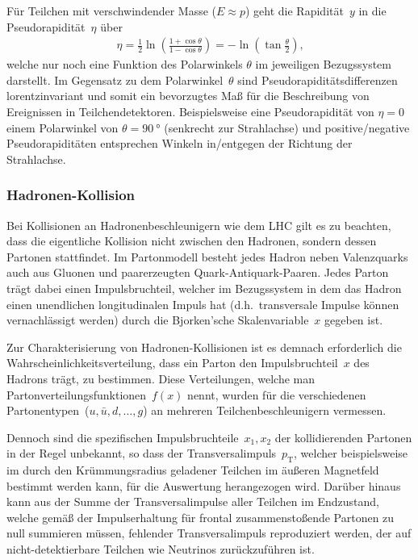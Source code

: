 \documentclass[11pt, a4paper]{article}
\numberwithin{equation}{section}
\begin{document}
Für Teilchen mit verschwindender Masse ($E \approx p$) geht die Rapidität~$y$ in die Pseudorapidität~$\eta$ über
\begin{align}
	\eta = \frac{1}{2} \ln\left( \frac{1 + \cos\theta}{1 - \cos\theta} \right) = - \ln\left( \tan\frac{\theta}{2} \right)\text{,}
	\label{eq:pseudorapidity}
\end{align}
welche nur noch eine Funktion des Polarwinkels $\theta$ im jeweiligen Bezugssystem darstellt.
Im Gegensatz zu dem Polarwinkel~$\theta$ sind Pseudorapiditätsdifferenzen lorentzinvariant und somit ein bevorzugtes Maß für die Beschreibung von Ereignissen in Teilchendetektoren.
Beispielsweise eine Pseudorapidität von $\eta = \num{0}$ einem Polarwinkel von $\theta = \SI{90}{\degree}$ (senkrecht zur Strahlachse) und positive/negative Pseudorapiditäten entsprechen Winkeln in/entgegen der Richtung der Strahlachse.

\subsubsection{Hadronen-Kollision}
\label{sssec:hadronen_kollision}
Bei Kollisionen an Hadronenbeschleunigern wie dem LHC gilt es zu beachten, dass die eigentliche Kollision nicht zwischen den Hadronen, sondern dessen Partonen stattfindet.
Im Partonmodell besteht jedes Hadron neben Valenzquarks auch aus Gluonen und paarerzeugten Quark-Antiquark-Paaren.
Jedes Parton trägt dabei einen Impulsbruchteil, welcher im Bezugssystem in dem das Hadron einen unendlichen longitudinalen Impuls hat (d.h.\ transversale Impulse können vernachlässigt werden) durch die Bjorken'sche Skalenvariable~$x$ gegeben ist.

Zur Charakterisierung von Hadronen-Kollisionen ist es demnach erforderlich die Wahrscheinlichkeitsverteilung, dass ein Parton den Impulsbruchteil~$x$ des Hadrons trägt, zu bestimmen.
Diese Verteilungen, welche man Partonverteilungsfunktionen~$f(x)$ nennt, wurden für die verschiedenen Partonentypen~($u, \bar{u}, d, \dots, g$) an mehreren Teilchenbeschleunigern vermessen.

Dennoch sind die spezifischen Impulsbruchteile~$x_1, x_2$ der kollidierenden Partonen in der Regel unbekannt, so dass der Transversalimpuls~$p_\mathrm{T}$, welcher beispielsweise im durch den Krümmungsradius geladener Teilchen im äußeren Magnetfeld bestimmt werden kann, für die Auswertung herangezogen wird.
Darüber hinaus kann aus der Summe der Transversalimpulse aller Teilchen im Endzustand, welche gemäß der Impulserhaltung für frontal zusammenstoßende Partonen zu null summieren müssen, fehlender Transversalimpuls reproduziert werden, der auf nicht-detektierbare Teilchen wie Neutrinos zurückzuführen ist.
\end{document}
